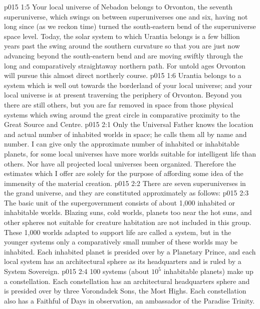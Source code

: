 \vs p015 1:5 Your local universe of Nebadon belongs to Orvonton, the seventh superuniverse, which swings on between superuniverses one and six, having not long since (as we reckon time) turned the south\hyp{}eastern bend of the superuniverse space level. Today, the solar system to which Urantia belongs is a few billion years past the swing around the southern curvature so that you are just now advancing beyond the south\hyp{}eastern bend and are moving swiftly through the long and comparatively straightaway northern path. For untold ages Orvonton will pursue this almost direct northerly course.
\vs p015 1:6 Urantia belongs to a system which is well out towards the borderland of your local universe; and your local universe is at present traversing the periphery of Orvonton. Beyond you there are still others, but you are far removed in space from those physical systems which swing around the great circle in comparative proximity to the Great Source and Centre.
\vs p015 2:1 Only the Universal Father knows the location and actual number of inhabited worlds in space; he calls them all by name and number. I can give only the approximate number of inhabited or inhabitable planets, for some local universes have more worlds suitable for intelligent life than others. Nor have all projected local universes been organized. Therefore the estimates which I offer are solely for the purpose of affording some idea of the immensity of the material creation.
\vs p015 2:2 \pc There are seven superuniverses in the grand universe, and they are constituted approximately as follows:
\vs p015 2:3 \bibnobreakspace {} The basic unit of the supergovernment consists of about 1,000 inhabited or inhabitable worlds. Blazing suns, cold worlds, planets too near the hot suns, and other spheres not suitable for creature habitation are not included in this group. These 1,000 worlds adapted to support life are called a system, but in the younger systems only a comparatively small number of these worlds may be inhabited. Each inhabited planet is presided over by a Planetary Prince, and each local system has an architectural sphere as its headquarters and is ruled by a System Sovereign.
\vs p015 2:4 \bibnobreakspace {} 100 systems (about $10^5$ inhabitable planets) make up a constellation. Each constellation has an architectural headquarters sphere and is presided over by three Vorondadek Sons, the Most Highs. Each constellation also has a Faithful of Days in observation, an ambassador of the Paradise Trinity.
